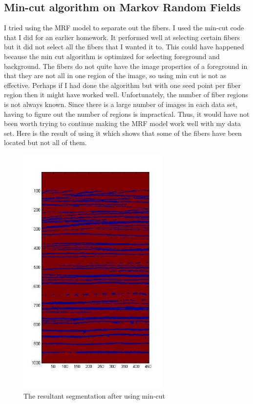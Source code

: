 \documentclass[11pt,psfig]{article}
\begin{document}
\subsection{Min-cut algorithm on Markov Random Fields}
I tried using the MRF model to separate out the fibers. I used the min-cut code that I did for an earlier homework. It performed well at selecting certain fibers but it did not select all the fibers that I wanted it to. This could have happened because the min cut algorithm is optimized for selecting foreground and background. The fibers do not quite have the image properties of a foreground in that they are not all in one region of the image, so using min cut is not as effective. Perhaps if I had done the algorithm but with one seed point per fiber region then it might have worked well. Unfortunately, the number of fiber regions is not always known. Since there is a large number of images in each data set, having to figure out the number of regions is impractical. Thus, it would have not been worth trying to continue making the MRF model work well with my data set. Here is the result of using it which shows that some of the fibers have been located but not all of them. \\
\begin{figure}[H]
\centering
\includegraphics[height=5in]{minCutResult.jpg}
\caption{The resultant segmentation after using min-cut}
\end{figure}
\end{document}

